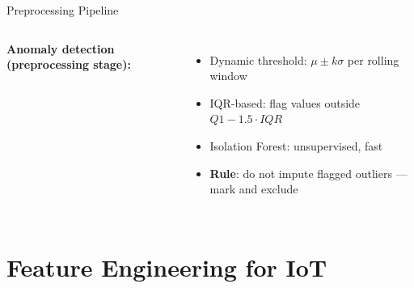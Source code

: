 \documentclass[aspectratio=169,11pt]{beamer}
\begin{document}
\begin{frame}{Preprocessing Pipeline}
\begin{columns}
        \textbf{Anomaly detection (preprocessing stage):}
        \begin{itemize}\setlength{\itemsep}{0pt}
            \item Dynamic threshold: $\mu \pm k\sigma$ per rolling window
            \item IQR-based: flag values outside $Q1 - 1.5\cdot IQR$
            \item Isolation Forest: unsupervised, fast
            \item \textbf{Rule}: do not impute flagged outliers --- mark and exclude
        \end{itemize}
    \end{columns}
\end{frame}

\section{Feature Engineering for IoT}
\end{document}

